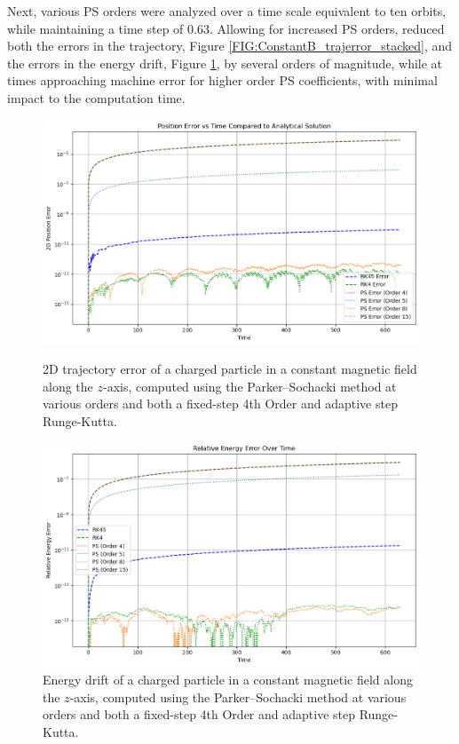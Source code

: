 \documentclass{article}
\begin{document}
Next, various PS orders were analyzed over a time scale equivalent to ten orbits, while maintaining a time step of 0.63. Allowing for increased PS orders, reduced both the errors in the trajectory, Figure \ref{FIG:ConstantB_trajerror_stacked}, and the errors in the energy drift, Figure \ref{FIG:ConstantB_engerror_stacked}, by several orders of magnitude, while at times approaching machine error for higher order PS coefficients, with minimal impact to the computation time.
        \begin{figure}[H]
            \centering
            \begin{minipage}[t]{0.48\textwidth}
                \centering
                \includegraphics[width=\textwidth]{Images/ConstantB/PS_StackedOrders_trajerror_comparison_UseCase1-1.png}
                \caption{2D trajectory error of a charged particle in a constant magnetic field along the $z$-axis, computed using the Parker–Sochacki method at various orders and both a fixed-step 4th Order and adaptive step Runge-Kutta.}
                \label{FIG:ConstantB_trajerror_stacked}
            \end{minipage}%
            \hfill
            \begin{minipage}[t]{0.48\textwidth}
                \centering
                \includegraphics[width=\textwidth]{Images/ConstantB/PS_StackedOrders_energy_comparison_UseCase1-1.png}
                \caption{Energy drift of a charged particle in a constant magnetic field along the $z$-axis, computed using the Parker–Sochacki method at various orders and both a fixed-step 4th Order and adaptive step Runge-Kutta.}
                \label{FIG:ConstantB_engerror_stacked}
            \end{minipage}
        \end{figure}
        
\end{document}
